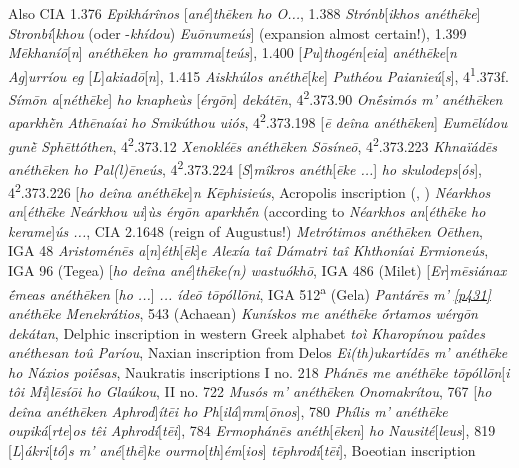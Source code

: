 Also CIA 1.376 \textit{Epikhárînos} {[}\textit{\emph{ané}}{]}\textit{\emph{thēken} ho O...}, 1.388 \textit{Strónb}{[}\textit{ikhos \emph{anéthēke}}{]} \textit{Stronbí}{[}\textit{khou} (oder -\textit{khídou}) \textit{Euōnumeús}{]} (expansion almost certain!), 1.399 \textit{Mēkhaníō}{[}\textit{n}{]} \textit{\emph{anéthēken} ho gramma}{[}\textit{teús}{]}, 1.400 {[}\textit{Pu}{]}\textit{thogén}{[}\textit{eia}{]} \textit{\emph{anéthēke}}{[}\textit{\emph{n} Ag}{]}\textit{urríou eg} {[}\textit{L}{]}\textit{akiadō}{[}\textit{n}{]}, 1.415 \textit{Aiskhúlos \emph{anéthē}}{[}\textit{\emph{ke}}{]} \textit{Puthéou Paianieú}{[}\textit{s}{]}, 4\textsuperscript{1}.373f. \textit{Símōn \emph{a}}{[}\textit{\emph{néthēke}}{]} \textit{ho knapheùs }{[}\textit{érgōn}{]} \textit{dekátēn}, 4\textsuperscript{2}.373.90 \textit{Onḗsimós m' \emph{anéthēken} aparkhḕn Athēnaíai ho Smikúthou uiós}, 4\textsuperscript{2}.373.198 {[}\textit{ē deîna \emph{anéthēken}}{]} \textit{Eumēlídou gunḕ Sphēttóthen}, 4\textsuperscript{2}.373.12 \textit{Xenokléēs \emph{anéthēken} Sōsíneō}, 4\textsuperscript{2}.373.223 \textit{Khnaïádēs \emph{anéthēken} ho Pal(l)ēneús}, 4\textsuperscript{2}.373.224 {[}\textit{S}{]}\textit{mîkros \emph{anéth}}{[}\textit{\emph{ēke} ...}{]} \textit{ho skulodeps}{[}\textit{ós}{]}, 4\textsuperscript{2}.373.226 {[}\textit{ho deîna \emph{anéthēke}}{]}\textit{\emph{n} Kēphisieús}, Acropolis inscription (\citealp{Kabbadias1886}, \citealp[135]{Studniczka1887}) \textit{Néarkhos \emph{an}}{[}\textit{\emph{éthēke} Neárkhou ui}{]}\textit{ùs érgōn aparkhḗn} (according to \citealp{Robert1887} \textit{Néarkhos \emph{an}}{[}\textit{\emph{éthēke} ho kerame}{]}\textit{ús ...}, CIA 2.1648 (reign of Augustus!) \textit{Metrótimos \emph{anéthēken} Oēthen}, IGA 48 \textit{Aristoménēs \emph{a}}{[}\textit{\emph{n}}{]}\textit{\emph{éth}}{[}\textit{\emph{ēk}}{]}\textit{\emph{e} Alexía taî Dámatri taî Khthoníai Ermioneús}, IGA 96 (Tegea) {[}\textit{ho deîna \emph{ané}}{]}\textit{\emph{thēke(n)} wastuókhō}, IGA 486 (Milet) {[}\textit{Er}{]}\textit{mēsiánax ḗmeas \emph{anéthēken}} {[}\textit{ho ...}{]} \textit{... ídeō tōpóllōni}, IGA 512\textsuperscript{a} (Gela) \textit{Pantárēs m'} \hyperlink{p431}{\emph{[p431]}} \textit{\emph{anéthēke} Menekrátios}, 543 (Achaean) \textit{Kunískos me \emph{anéthēke} ṓrtamos wérgōn dekátan}, Delphic inscription in western Greek alphabet \citep[445]{Haussoullier1882} \textit{toì Kharopínou paîdes \emph{anéthesan} toû Paríou}, Naxian inscription from Delos \citep[464f.]{Homolle1888} \textit{Ei(th)ukartídēs m' \emph{anéthēke} ho Náxios poiḗsas}, Naukratis inscriptions I no. 218 \textit{Phánēs me \emph{anéthēke} tōpóllōn}{[}\textit{i tôi Mi}{]}\textit{lēsíōi ho Glaúkou}, II no. 722 \textit{Musós m' \emph{anéthēken} Onomakrítou}, 767 {[}\textit{ho deîna \emph{anéthēken} Aphrod}{]}\textit{ítēi ho Ph}{[}\textit{ilá}{]}\textit{mm}{[}\textit{ōnos}{]}, 780 \textit{Phílis m' \emph{anéthēke} oupiká}{[}\textit{rte}{]}\textit{os têi Aphrodí}{[}\textit{tēi}{]}, 784 \textit{Ermophánēs \emph{anéth}}{[}\textit{\emph{ēken}}{]} \textit{ho Nausité}{[}\textit{leus}{]}, 819 {[}\textit{L}{]}\textit{ákri}{[}\textit{tó}{]}\textit{s m' \emph{ané}}{[}\textit{\emph{thē}}{]}\textit{\emph{ke} ourmo}{[}\textit{th}{]}\textit{ém}{[}\textit{ios}{]}\textit{ tēphrodí}{[}\textit{tēi}{]}, Boeotian inscription 